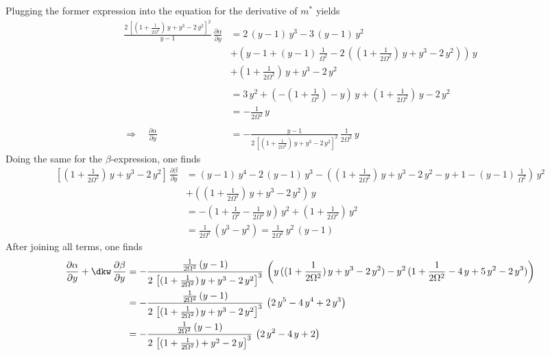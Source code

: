 \begin{appendices}
    Plugging the former expression into the equation for the derivative of $m^*$ yields
    \begin{align*}
        \frac{2\,\left[(1+\frac{1}{2\Omega^2})\,{y}+{y}^3-2\,{y}^2\right]^2}{{y}-1}\,\frac{\partial \alpha}{\partial{y}}&=2\,({y}-1)\,{y}^3-3\,({y}-1)\,{y}^2\\
        &+\left( {y}-1+({y}-1)\,\frac{1}{\Omega^2}-2\,\left((1+\frac{1}{2\Omega^2})\,{y}+{y}^3-2\,{y}^2\right) \right)\,{y}\\
        &+(1+\frac{1}{2\Omega^2})\,{y}+{y}^3-2\,{y}^2 \\\\
        &=3\,{y}^2+\left( -(1+\frac{1}{\Omega^2})-{y}\right)\,{y}+(1+\frac{1}{2\Omega^2})\,{y}-2\,{y}^2\\
        &=-\frac{1}{2\Omega^2}\,{y}\\\\
        \Rightarrow\quad\frac{\partial \alpha}{\partial{y}}&=-\frac{{y}-1}{2\,\left[(1+\frac{1}{2\Omega^2})\,{y}+{y}^3-2\,{y}^2\right]^2}\,\frac{1}{2\Omega^2}\,{y}
    \end{align*}
    Doing the same for the $\beta$-expression, one finds
    \begin{align*}
        \left[(1+\frac{1}{2\Omega^2})\,{y}+{y}^3-2\,{y}^2\right]\,\frac{\partial \beta}{\partial{y}}&=({y}-1)\,{y}^4-2\,({y}-1)\,{y}^3-\left( (1+\frac{1}{2\Omega^2})\,{y}+{y}^3-2\,{y}^2-{y}+1-({y}-1)\,\frac{1}{\Omega^2} \right)\,{y}^2\\
        &+((1+\frac{1}{2\Omega^2})\,{y}+{y}^3-2\,{y}^2)\,{y}\\
        &=-\left( 1+\frac{1}{\Omega^2}-\frac{1}{2\Omega^2}\,{y}  \right)\,{y}^2+(1+\frac{1}{2\Omega^2})\,{y}^2\\
        &=\frac{1}{2\Omega^2}\,({y}^3-{y}^2)=\frac{1}{2\Omega^2}\,{y}^2\,({y}-1)
    \end{align*}
    After joining all terms, one finds
    \begin{align*}
        \frac{\partial \alpha}{\partial{y}}+\dkw\,\frac{\partial \beta}{\partial{y}}&=-\frac{\frac{1}{2\Omega^2}\,({y}-1)}{2\,\left[(1+\frac{1}{2\Omega^2})\,{y}+{y}^3-2\,{y}^2\right]^3}\,\left( {y}\,((1+\frac{1}{2\Omega^2})\,{y}+{y}^3-2\,{y}^2) -{y}^2\,(1+\frac{1}{2\Omega^2}-4\,{y}+5\,{y}^2-2\,{y}^3)\right)\\
        &=-\frac{\frac{1}{2\Omega^2}\,({y}-1)}{2\,\left[(1+\frac{1}{2\Omega^2})\,{y}+{y}^3-2\,{y}^2\right]^3}\,\left( 2\,{y}^5-4\,{y}^4+2\,{y}^3 \right)\\
        &=-\frac{\frac{1}{2\Omega^2}\,({y}-1)}{2\,\left[(1+\frac{1}{2\Omega^2})+{y}^2-2\,{y}\right]^3}\,\left( 2\,{y}^2-4\,{y}+2 \right)

\end{align*}
\end{appendices}
